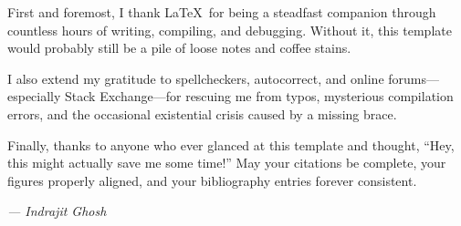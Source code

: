 
First and foremost, I thank \LaTeX\ for being a steadfast companion through countless hours of writing, compiling, and debugging. Without it, this template would probably still be a pile of loose notes and coffee stains.  

I also extend my gratitude to spellcheckers, autocorrect, and online forums—especially Stack Exchange—for rescuing me from typos, mysterious compilation errors, and the occasional existential crisis caused by a missing brace.  

Finally, thanks to anyone who ever glanced at this template and thought, “Hey, this might actually save me some time!” May your citations be complete, your figures properly aligned, and your bibliography entries forever consistent.

\vspace{1cm}
\begin{flushright}
\textit{--- Indrajit Ghosh}
\end{flushright}
